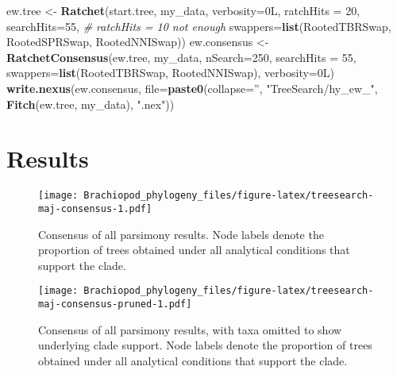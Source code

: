 \documentclass[openany]{book}
\newenvironment{Shaded}{\begin{snugshade}}{\end{snugshade}}
\newcommand{\KeywordTok}[1]{\textcolor[rgb]{0.13,0.29,0.53}{\textbf{#1}}}
\newcommand{\DataTypeTok}[1]{\textcolor[rgb]{0.13,0.29,0.53}{#1}}
\newcommand{\DecValTok}[1]{\textcolor[rgb]{0.00,0.00,0.81}{#1}}
\newcommand{\StringTok}[1]{\textcolor[rgb]{0.31,0.60,0.02}{#1}}
\newcommand{\CommentTok}[1]{\textcolor[rgb]{0.56,0.35,0.01}{\textit{#1}}}
\newcommand{\NormalTok}[1]{#1}
\theoremstyle{definition}
\theoremstyle{definition}
\theoremstyle{definition}
\theoremstyle{remark}
\begin{document}
\begin{Shaded}
\begin{Highlighting}[]
\NormalTok{ew.tree <-}\StringTok{ }\KeywordTok{Ratchet}\NormalTok{(start.tree, my_data, }\DataTypeTok{verbosity=}\NormalTok{0L,}
                   \DataTypeTok{ratchHits =} \DecValTok{20}\NormalTok{, }\DataTypeTok{searchHits=}\DecValTok{55}\NormalTok{, }\CommentTok{# ratchHits = 10 not enough}
                   \DataTypeTok{swappers=}\KeywordTok{list}\NormalTok{(RootedTBRSwap, RootedSPRSwap, RootedNNISwap))}
\NormalTok{ew.consensus <-}\StringTok{ }\KeywordTok{RatchetConsensus}\NormalTok{(ew.tree, my_data, }\DataTypeTok{nSearch=}\DecValTok{250}\NormalTok{, }\DataTypeTok{searchHits =} \DecValTok{55}\NormalTok{,}
                                 \DataTypeTok{swappers=}\KeywordTok{list}\NormalTok{(RootedTBRSwap, RootedNNISwap),}
                                 \DataTypeTok{verbosity=}\NormalTok{0L)}
\KeywordTok{write.nexus}\NormalTok{(ew.consensus, }\DataTypeTok{file=}\KeywordTok{paste0}\NormalTok{(}\DataTypeTok{collapse=}\StringTok{''}\NormalTok{, }\StringTok{"TreeSearch/hy_ew_"}\NormalTok{,}
                                      \KeywordTok{Fitch}\NormalTok{(ew.tree, my_data), }\StringTok{".nex"}\NormalTok{))}
\end{Highlighting}
\end{Shaded}

\section{Results}\label{results}






\begin{figure}
\centering
\texttt{[image: Brachiopod\_phylogeny\_files/figure-latex/treesearch-maj-consensus-1.pdf]}
\caption{\label{fig:treesearch-maj-consensus}Consensus of all parsimony results.
Node labels denote the proportion of trees obtained
under all analytical conditions that support the clade.}
\end{figure}




\begin{figure}
\centering
\texttt{[image: Brachiopod\_phylogeny\_files/figure-latex/treesearch-maj-consensus-pruned-1.pdf]}
\caption{\label{fig:treesearch-maj-consensus-pruned}Consensus of all parsimony results, with taxa omitted
to show underlying clade support.
Node labels denote the proportion of trees obtained
under all analytical conditions that support the clade.}
\end{figure}
\end{document}

